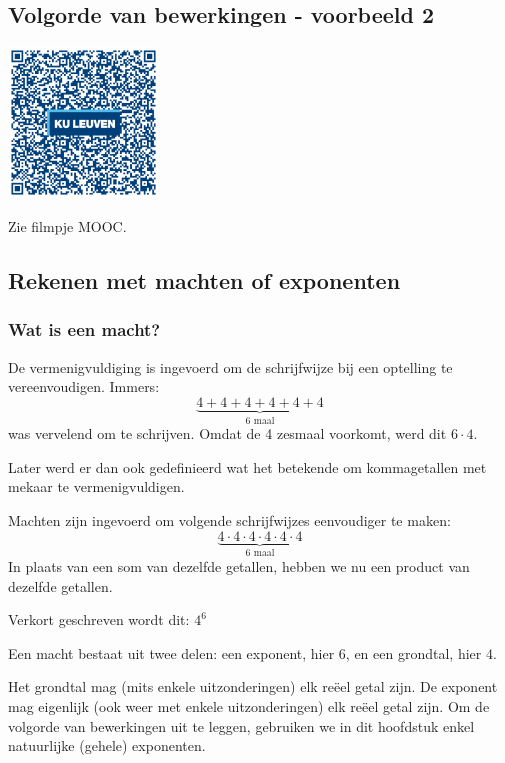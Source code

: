 \subsection{Volgorde van bewerkingen - voorbeeld 2}
\begin{minipage}{.25\linewidth}
	\raggedright
	\includegraphics[width=4cm]{1_elem_rekenvaardigheden_A/inputs/QR_Code_VOLGORDE2_module1new}
\end{minipage}
\begin{minipage}{.7\linewidth}
	Zie filmpje MOOC.
\end{minipage}

\subsection{Rekenen met machten of exponenten}
\subsubsection{Wat is een macht?}
De vermenigvuldiging is ingevoerd om de schrijfwijze bij een optelling te vereenvoudigen. Immers:
\begin{equation*}
\underbrace{4+4+4+4+4+4}_{\text{6 maal}}
\end{equation*}
was vervelend om te schrijven. Omdat de 4 zesmaal voorkomt, werd dit $6 \cdot 4$.

Later werd er dan ook gedefinieerd wat het betekende om kommagetallen met mekaar te vermenigvuldigen.

Machten zijn ingevoerd om volgende schrijfwijzes eenvoudiger te maken:
\begin{equation*}
\underbrace{4 \cdot 4\cdot4\cdot4\cdot4\cdot4}_{\text{6 maal}}
\end{equation*}
In plaats van een som van dezelfde getallen, hebben we nu een product van dezelfde getallen.

Verkort geschreven wordt dit: $4^6$

Een macht bestaat uit twee delen: een exponent, hier $6$, en een grondtal, hier $4$.

Het grondtal mag (mits enkele uitzonderingen) elk re\"eel getal zijn. De exponent mag eigenlijk (ook weer met enkele uitzonderingen) elk re\"eel getal zijn. Om de volgorde van bewerkingen uit te leggen, gebruiken we in dit hoofdstuk enkel natuurlijke (gehele) exponenten.

